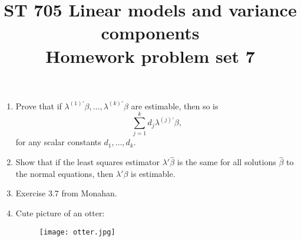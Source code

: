 \documentclass[11pt]{article}
\title{ST 705 Linear models and variance components \\ 
        Homework problem set 7}
\begin{document}
\maketitle

\begin{enumerate}

\item Prove that if $\lambda^{(1)'}\beta,\dots,\lambda^{(k)'}\beta$ are estimable, then so is 
\[
\sum_{j=1}^{k}d_{j}\lambda^{(j)'}\beta,
\]
for any scalar constants $d_{1},\dots,d_{k}$.

\item Show that if the least squares estimator $\lambda'\widehat{\beta}$ is the same for all solutions $\widehat{\beta}$ to the normal equations, then $\lambda'\beta$ is estimable.

\item Exercise 3.7 from Monahan.

\item Cute picture of an otter:
\begin{figure}[H]
\centering
\texttt{[image: otter.jpg]}
\end{figure}

\end{enumerate}
\end{document}
